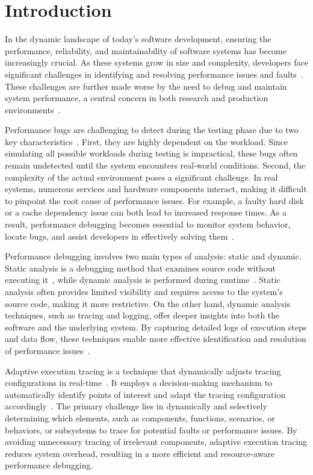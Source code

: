 \documentclass[pdflatex,sn-nature]{sn-jnl}%
\theoremstyle{thmstyleone}%
\theoremstyle{thmstyletwo}%
\theoremstyle{thmstylethree}%
\begin{document}
\section{Introduction}

In the dynamic landscape of today's software development, ensuring the performance, reliability, and maintainability of software systems has become increasingly crucial. As these systems grow in size and complexity, developers face significant challenges in identifying and resolving performance issues and faults~\cite{ayewah2008using,ball1999concept}. These challenges are further made worse by the need to debug and maintain system performance, a central concern in both research and production environments~\cite{sturmann2020using}. 

Performance bugs are challenging to detect during the testing phase due to two key characteristics~\cite{zhang2020diagnostic}. First, they are highly dependent on the workload. Since simulating all possible workloads during testing is impractical, these bugs often remain undetected until the system encounters real-world conditions. Second, the complexity of the actual environment poses a significant challenge. In real systems, numerous services and hardware components interact, making it difficult to pinpoint the root cause of performance issues. For example, a faulty hard disk or a cache dependency issue can both lead to increased response times. As a result, performance debugging becomes essential to monitor system behavior, locate bugs, and assist developers in effectively solving them~\cite{ates2019automated}.

Performance debugging involves two main types of analysis: static and dynamic. Static analysis is a debugging method that examines source code without executing it~\cite{ayewah2008using}, while dynamic analysis is performed during runtime~\cite{ball1999concept}. Static analysis often provides limited visibility and requires access to the system's source code, making it more restrictive. On the other hand, dynamic analysis techniques, such as tracing and logging, offer deeper insights into both the software and the underlying system. By capturing detailed logs of execution steps and data flow, these techniques enable more effective identification and resolution of performance issues~\cite{parker-2020}.

Adaptive execution tracing is a technique that dynamically adjusts tracing configurations in real-time~\cite{peiris2012adapting,parker-2020}. It employs a decision-making mechanism to automatically identify points of interest and adapt the tracing configuration accordingly~\cite{ates2019automated}. The primary challenge lies in dynamically and selectively determining which elements, such as components, functions, scenarios, or behaviors, or subsystems to trace for potential faults or performance issues. By avoiding unnecessary tracing of irrelevant components, adaptive execution tracing reduces system overhead, resulting in a more efficient and resource-aware performance debugging.
\end{document}
